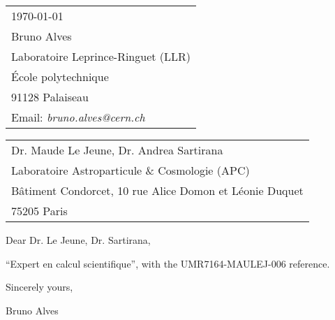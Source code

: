 \documentclass{article}
\begin{document}
\hfill
\begin{tabular}{l @{}}
\hfill \today \bigskip\\ %
\hfill Bruno Alves \\
\hfill Laboratoire Leprince-Ringuet (LLR) \\
\hfill École polytechnique \\
\hfill 91128 Palaiseau \\[.15cm]
\hfill Email: \textit{bruno.alves@cern.ch} \\
\end{tabular}

\bigskip %


\begin{tabular}{@{} l}
	Dr. Maude Le Jeune, Dr. Andrea Sartirana \\
	Laboratoire Astroparticule \& Cosmologie (APC) \\
    Bâtiment Condorcet, 10 rue Alice Domon et Léonie Duquet \\
    75205 Paris
\end{tabular}

\bigskip %

Dear Dr. Le Jeune, Dr. Sartirana,

\bigskip %


``Expert en calcul scientifique'', with the UMR7164-MAULEJ-006 reference.

\bigskip %

Sincerely yours,

\vspace{20pt} %

Bruno Alves \\
\end{document}
